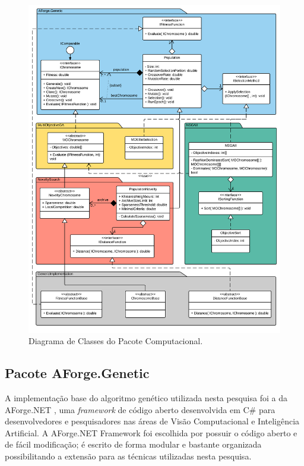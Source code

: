 \begin{figure}[htb]
	\begin{center}
		\includegraphics[width=1.0\textwidth]{Imagens/dev_class_diagram.png}
		\caption{Diagrama de Classes do Pacote Computacional.}
		\label{fig:dev_class_diagram}
	\end{center}
\end{figure}

\FloatBarrier

\subsection{Pacote AForge.Genetic}

A implementação base do algoritmo genético utilizada nesta pesquisa foi a da AForge.NET \cite{kirillov2013aforge}, uma \emph{framework} de código aberto desenvolvida em C\# para desenvolvedores e pesquisadores nas áreas de Visão Computacional e Inteligência Artificial. A AForge.NET Framework foi escolhida por possuir o código aberto e de fácil modificação; é escrito de forma modular e bastante organizada possibilitando a extensão para as técnicas utilizadas nesta pesquisa.

